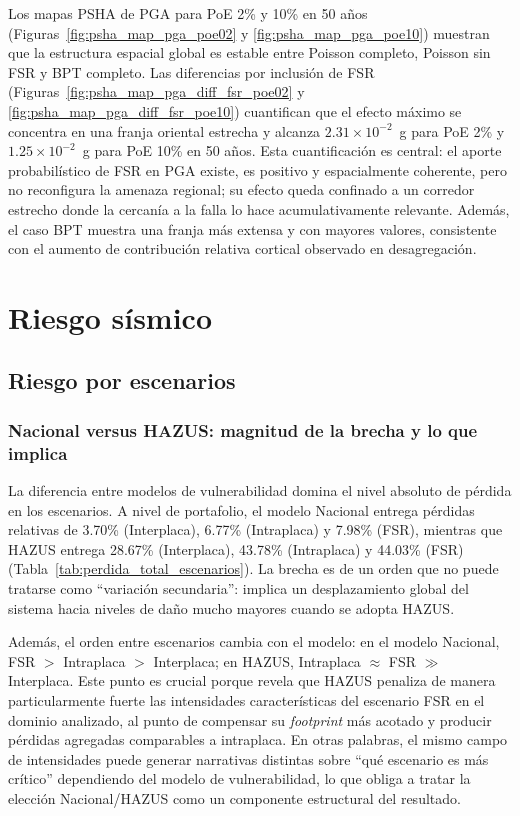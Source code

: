 Los mapas PSHA de PGA para PoE 2\% y 10\% en 50 años (Figuras~\ref{fig:psha_map_pga_poe02} y \ref{fig:psha_map_pga_poe10}) muestran que la estructura espacial global es estable entre Poisson completo, Poisson sin FSR y BPT completo. Las diferencias por inclusión de FSR (Figuras~\ref{fig:psha_map_pga_diff_fsr_poe02} y \ref{fig:psha_map_pga_diff_fsr_poe10}) cuantifican que el efecto máximo se concentra en una franja oriental estrecha y alcanza $2.31\times10^{-2}$~g para PoE 2\% y $1.25\times10^{-2}$~g para PoE 10\% en 50 años. Esta cuantificación es central: el aporte probabilístico de FSR en PGA existe, es positivo y espacialmente coherente, pero no reconfigura la amenaza regional; su efecto queda confinado a un corredor estrecho donde la cercanía a la falla lo hace acumulativamente relevante. Además, el caso BPT muestra una franja más extensa y con mayores valores, consistente con el aumento de contribución relativa cortical observado en desagregación.

\section{Riesgo sísmico}
\label{sec:disc_riesgo}

\subsection{Riesgo por escenarios}
\label{subsec:disc_riesgo_escenarios}


\subsubsection{Nacional versus HAZUS: magnitud de la brecha y lo que implica}
\label{subsubsec:disc_riesgo_vulnerabilidad}

La diferencia entre modelos de vulnerabilidad domina el nivel absoluto de pérdida en los escenarios. A nivel de portafolio, el modelo Nacional entrega pérdidas relativas de 3.70\% (Interplaca), 6.77\% (Intraplaca) y 7.98\% (FSR), mientras que HAZUS entrega 28.67\% (Interplaca), 43.78\% (Intraplaca) y 44.03\% (FSR) (Tabla~\ref{tab:perdida_total_escenarios}). La brecha es de un orden que no puede tratarse como ``variación secundaria'': implica un desplazamiento global del sistema hacia niveles de daño mucho mayores cuando se adopta HAZUS.

Además, el orden entre escenarios cambia con el modelo: en el modelo Nacional, FSR $>$ Intraplaca $>$ Interplaca; en HAZUS, Intraplaca $\approx$ FSR $\gg$ Interplaca. Este punto es crucial porque revela que HAZUS penaliza de manera particularmente fuerte las intensidades características del escenario FSR en el dominio analizado, al punto de compensar su \textit{footprint} más acotado y producir pérdidas agregadas comparables a intraplaca. En otras palabras, el mismo campo de intensidades puede generar narrativas distintas sobre ``qué escenario es más crítico'' dependiendo del modelo de vulnerabilidad, lo que obliga a tratar la elección Nacional/HAZUS como un componente estructural del resultado.

